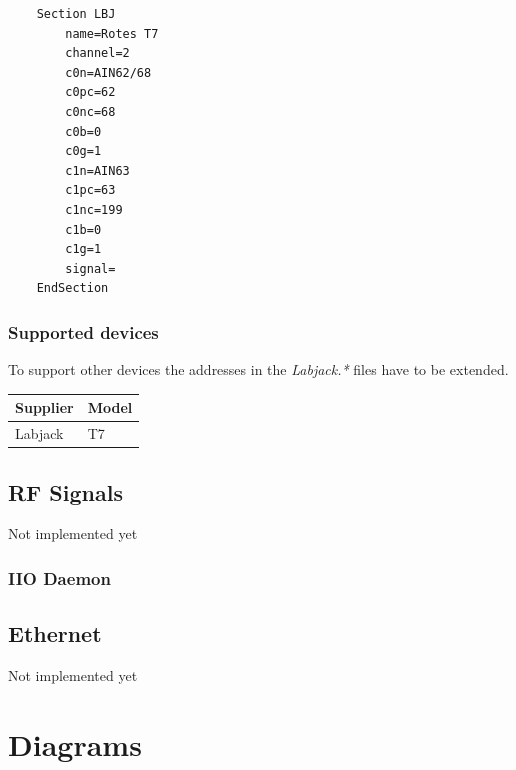 \documentclass[10pt,a4paper]{article}
\begin{document}
	\begin{lstlisting}
	Section LBJ
		name=Rotes T7
		channel=2
		c0n=AIN62/68
		c0pc=62
		c0nc=68
		c0b=0
		c0g=1
		c1n=AIN63
		c1pc=63
		c1nc=199
		c1b=0
		c1g=1
		signal=
	EndSection
	\end{lstlisting}
	
		\subsubsection{Supported devices}
		To support other devices the addresses in the \textit{Labjack.*} files have to be extended.
	
		\begin{table}[H]
		\centering
		\begin{tabular}{ll}
		\toprule
		Supplier			& Model \\ \midrule
		Labjack				& T7 \\
		\bottomrule
		\end{tabular}			
		\end{table}	

	\subsection{RF Signals}
	Not implemented yet
	
		\subsubsection{IIO Daemon}
		
	\subsection{Ethernet}
	Not implemented yet

\appendix

\section{Diagrams}

	
\end{document}
